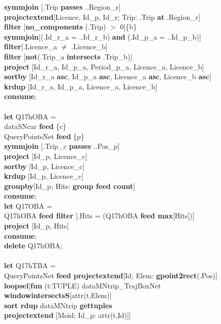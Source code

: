 \documentclass[a4paper]{article}
\newcommand{\op}[1]{\textbf{#1}}
\begin{document}
\begin{scriptsize}
\begin{tabbing}
\>\>\op{symmjoin} [.Trip \op{passes} ..Region\_r]\\
\>\>\>\op{projectextend}[Licence, Id\_p, Id\_r; Trip: .Trip \op{at}
.Region\_r]\\
\>\>\>\op{filter} [\op{no\_components} (.Trip) $>$ 0]\{b\}\\
\>\op{symmjoin}[(.Id\_r\_a = ..Id\_r\_b) \op{and} (.Id\_p\_a = ..Id\_p\_b)]\\
\>\op{filter}[.Licence\_a $\neq$ .Licence\_b]\\
\>\op{filter} [\op{not}(.Trip\_a \op{intersects} .Trip\_b)]\\
\>\op{project} [Id\_r\_a, Id\_p\_a, Period\_p\_a, Licence\_a, Licence\_b]\\
\>\op{sortby} [Id\_r\_a \op{asc}, Id\_p\_a \op{asc}, Licence\_a \op{asc},
Licence\_b \op{asc}]\\
\>\op{krdup} [Id\_r\_a, Id\_p\_a, Licence\_a, Licence\_b]\\
\op{consume};\\
\\
\op{let} Q17hOBA =\\
\>dataSNcar \op{feed} \{c\}\\
\>QueryPointsNet \op{feed} \{p\}\\
\>\op{symmjoin} [.Trip\_c \op{passes} ..Pos\_p]\\
\>\op{project} [Id\_p, Licence\_c]\\
\>\op{sortby} [Id\_p, Licence\_c]\\
\>\op{krdup} [Id\_p, Licence\_c]\\
\>\op{groupby}[Id\_p; Hits: \op{group feed count}]\\
\op{consume};\\
\op{let} Q17OBA =\\
\>Q17hOBA \op{feed filter} [.Hits = (Q17hOBA \op{feed max}[Hits])]\\
\>\op{project} [Id\_p, Hits]\\
\op{consume};\\
\op{delete} Q17hOBA;\\
\\
\op{let} Q17hTBA =\\
\>QueryPointsNet \op{feed projectextend}[Id; Elem: \op{gpoint2rect}(.Pos)]\\
\>\op{loopsel}[\op{fun} (t:TUPLE) dataMNtrip\_TrajBoxNet
\op{windowintersectsS}[attr(t,Elem)]\\
\>\>\op{sort rdup} dataMNtrip \op{gettuples}\\
\>\>\op{projectextend} [Moid; Id\_p: attr(t,Id)]]\\

\end{tabbing}
\end{scriptsize}
\end{document}
